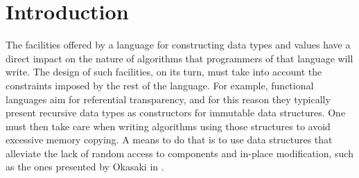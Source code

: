 \documentclass{acm_proc_article-sp}
\begin{document}



\section{Introduction}

The facilities offered by a language for constructing data types and values
have a direct impact on the nature of algorithms that programmers of that
language will write. The design of such facilities, on its turn, must take
into account the constraints imposed by the rest of the language. For example,
functional languages aim for referential transparency, and for this reason
they typically present recursive data types as constructors for immutable data
structures. One must then take care when writing algorithms using those
structures to avoid excessive memory copying. A means to do that is to use
data structures that alleviate the lack of random access to components and
in-place modification, such as the ones presented by Okasaki in
\cite{okasaki.purely}.
\end{document}
